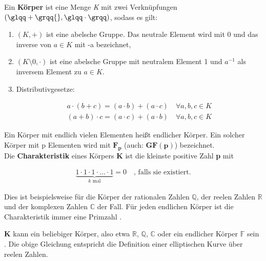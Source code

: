 Ein \textbf{Körper} ist eine Menge \textit{K} mit zwei
Verknüpfungen \((\glqq + \grqq{},\glqq \cdot \grqq)\), sodass es gilt:
\begin{enumerate}
    \item \((\textit{K}, +)\) ist eine abelsche Gruppe. Das neutrale
    Element wird mit 0 und das inverse von \(a \in \textit{K}\)  mit -a bezeichnet, 
    \item \((\textit{K}\setminus 0, \cdot)\) ist eine abelsche Gruppe mit neutralem Element 1 und $ a^{-1} $ als inversem Element zu \(a \in \textit{K}\).
    \item Distributivgesetze:
    \begin{ceqn}
     \begin{align*}
          a \cdot (b + c ) = (a \cdot b) + (a \cdot c) \quad \forall a, b, c \in \textit{K} \\
         (a + b) \cdot c = (a \cdot c) + (a \cdot b) \quad \forall a, b, c \in \textit{K}
     \end{align*}
    \end{ceqn}
    
\end{enumerate} 
Ein Körper mit endlich vielen Elementen heißt endlicher Körper. Ein solcher Körper mit p Elementen wird mit $ \mathbf{F_p}$ (auch:
$ \mathbf{GF(p)} $) bezeichnet.\\

Die \textbf{Charakteristik} eines Körpers $ \mathbf{K} $ ist die kleinste positive Zahl \textbf{p} mit 
\begin{ceqn}
\begin{align*}
   \underbrace{1 \cdot 1 \cdot 1 \cdot \ldots \cdot 1}_{\text{$k$ mal} } = 0   \quad \text{, falls sie existiert.}
\end{align*}
\end{ceqn}
 
Dies ist beispielsweise für die Körper der rationalen Zahlen $ \mathbb{Q} $, der reelen Zahlen $ \mathbb{R} $ und der komplexen Zahlen $\mathbb{C} $ der Fall. Für jeden endlichen Körper ist die Charakteristik immer eine Primzahl \cite{damer}.

$ \mathbf{K} $ kann ein beliebiger Körper, also etwa $ \mathbb{R} $, $ \mathbb{Q} $, $ \mathbb{C} $ oder ein endlicher Körper $ \mathbb{F} $ sein \cite{werner}. Die obige Gleichung entspricht die Definition einer elliptischen Kurve über reelen Zahlen.\\


